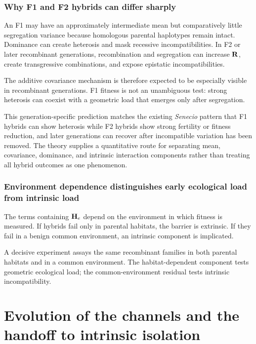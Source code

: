 \section{Why F1 and F2 hybrids can differ sharply}

An F1 may have an approximately intermediate mean but comparatively little segregation variance because homologous parental haplotypes remain intact. Dominance can create heterosis and mask recessive incompatibilities. In F2 or later recombinant generations, recombination and segregation can increase \(\mathbf{R}\), create transgressive combinations, and expose epistatic incompatibilities.

\begin{biobox}
The additive covariance mechanism is therefore expected to be especially visible in recombinant generations. F1 fitness is not an unambiguous test: strong heterosis can coexist with a geometric load that emerges only after segregation.
\end{biobox}

\begin{connectionbox}
This generation-specific prediction matches the existing \textit{Senecio} pattern that F1 hybrids can show heterosis while F2 hybrids show strong fertility or fitness reduction, and later generations can recover after incompatible variation has been removed. The theory supplies a quantitative route for separating mean, covariance, dominance, and intrinsic interaction components rather than treating all hybrid outcomes as one phenomenon.
\end{connectionbox}

\section{Environment dependence distinguishes early ecological load from intrinsic load}

The terms containing \(\mathbf{H}_e\) depend on the environment in which fitness is measured. If hybrids fail only in parental habitats, the barrier is extrinsic. If they fail in a benign common environment, an intrinsic component is implicated.

\begin{summarybox}
A decisive experiment assays the same recombinant families in both parental habitats and in a common environment. The habitat-dependent component tests geometric ecological load; the common-environment residual tests intrinsic incompatibility.
\end{summarybox}

\part{Evolution of the channels and the handoff to intrinsic isolation}
